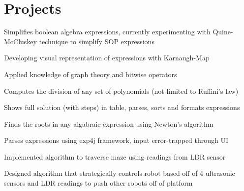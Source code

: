 \documentclass[]{deedy-resume-openfont}
\begin{document}
\begin{minipage}[t]{0.66\textwidth}

\section{Projects}

\begin{tightemize}
\item Simplifies boolean algebra expressions, currently experimenting with Quine-McCluskey technique to simplify SOP expressions\\
\item Developing visual representation of expressions with Karnaugh-Map\\
\item Applied knowledge of graph theory and bitwise operators\\
\end{tightemize}
\sectionsep

\begin{tightemize}
\item Computes the division of any set of polynomials (not limited to Ruffini's law)\\
\item Shows full solution (with steps) in table, parses, sorts and formats expressions\\
\end{tightemize}
\sectionsep


\begin{tightemize}
\item Finds the roots in any algabraic expression using Newton's algorithm\\
\item Parses expressions using exp4j framework, input error-trapped through UI\\
\end{tightemize}
\sectionsep

\begin{tightemize}
\item Implemented algorithm to traverse maze using readings from LDR sensor \\
\item Designed algorithm that strategically controls robot based off of 4 ultrasonic sensors and LDR readings to push other robots off of platform\\
\end{tightemize}
\sectionsep


\end{minipage}
\end{document}
